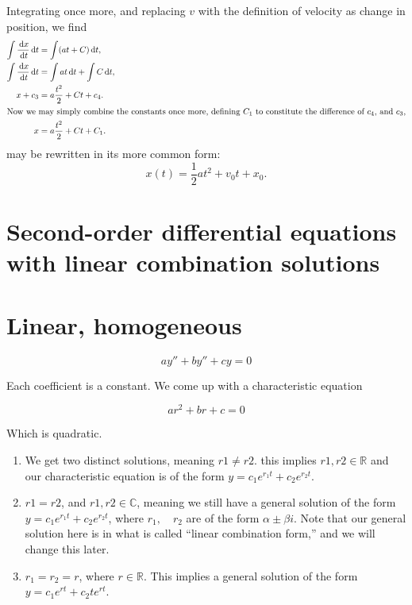 \begin{ex}
    Integrating once more, and replacing $v$ with the definition of velocity as change in position, we find
    \begin{align}
        \int \frac{\,\mathrm{d} x}{\,\mathrm{d} t} \,\mathrm{d} t &= \int (at + C) \,\mathrm{d} t, \nonumber \\
        \int \frac{\,\mathrm{d} x}{\,\mathrm{d} t} \,\mathrm{d} t &= \int at \,\mathrm{d} t + \int C \,\mathrm{d} t, \nonumber \\
        x + c_3  &= a \frac{t^2}{2} + Ct + c_4. \nonumber \\
        \intertext{Now we may simply combine the constants once more, defining $C_1$ to constitute the difference of $c_4$, and $c_3$,}
        x &= a \frac{t^2}{2} + Ct + C_1. \label{eq:phys_const}
    \end{align}
     may be rewritten in its more common form:
    \begin{equation}
        x(t) = \frac{1}{2} a t^2 + v_0 t + x_0.
        \label{eq:position}
    \end{equation}
\end{ex}

\section{Second-order differential equations with linear combination solutions}

\section{Linear, homogeneous}

\[ ay'' + by'' +cy = 0 \]

Each coefficient is a constant. We come up with a 
characteristic equation

\[ ar^2 +br + c = 0 \]

Which is quadratic.

\begin{enumerate}
    \item We get two distinct solutions, meaning $r1 \neq r2$. this implies 
        $r1, r2 \in \mathbb{R}$ and our characteristic equation is of the form
        $y = c_1 e^{r_1t}+c_2e^{r_2t}$.
    \item $r1 = r2 $, and $r1, r2 \in \mathbb{C}$,
        meaning we still have a general solution of the form
        $y = c_1 e^{r_1t} + c_2 e^{r_2t}$, where $r_1,\quad r_2$ are of the form
        $\alpha \pm \beta i$. Note that our general solution here is in what
        is called ``linear combination form,'' and we will change this later.
    \item $r_1=r_2=r$, where $r \in \mathbb{R}$.
        This implies a general solution of the form $y=c_1e^{rt}+c_2te^{rt}$.
\end{enumerate}

